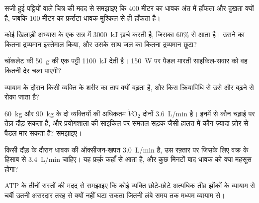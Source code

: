 \begin{exercise}[$\star\star$]\label{exo:g10:exercise-and-energy:8}
सजी हुई पट्टियों वाले चित्र की मदद से समझाइए कि 400 मीटर का धावक अंत में
हाँफता और दुखता क्यों है, जबकि 100 मीटर का फ़र्राटा धावक मुश्किल से ही
हाँफता है।
\end{exercise}

\begin{exercise}[$\star\star$]\label{exo:g10:exercise-and-energy:9}
कोई खिलाड़ी अभ्यास के एक सत्र में \qty{3000}{kJ} ख़र्च करती है, जिसका
60\%  से आता है। उसने  का कितना द्रव्यमान इस्तेमाल
किया, और उसके साथ जल का कितना द्रव्यमान छूटा?
\end{exercise}

\begin{exercise}[$\star\star$]\label{exo:g10:exercise-and-energy:10}
चॉकलेट की \qty{50}{g} की एक पट्टी \qty{1100}{kJ} देती है। \qty{150}{W}
पर पैडल मारती साइकिल-सवार को वह कितनी देर चला पाएगी?
\end{exercise}

\begin{exercise}[$\star\star$]\label{exo:g10:exercise-and-energy:11}
व्यायाम के दौरान किसी व्यक्ति के शरीर का ताप क्यों बढ़ता है, और किस
क्रियाविधि से उसे और बढ़ने से रोका जाता है?
\end{exercise}

\begin{exercise}[$\star\star\star$]\label{exo:g10:exercise-and-energy:12}
\qty{60}{kg} और \qty{90}{kg} के दो व्यक्तियों की अधिकतम
$\dot V\!\mathrm{O_2}$ दोनों \qty{3.6}{L/min} है। इनमें से कौन चढ़ाई पर
तेज़ दौड़ सकता है, और प्रयोगशाला की साइकिल पर समतल सड़क जैसी हालत में
कौन ज़्यादा ज़ोर से पैडल मार सकता है? समझाइए।
\end{exercise}

\begin{exercise}[$\star\star\star$]\label{exo:g10:exercise-and-energy:13}
किसी दौड़ के दौरान धावक की ऑक्सीजन-खपत \qty{3.0}{L/min} है, उस रफ़्तार
पर जिसके लिए वक्र के हिसाब से \qty{3.4}{L/min} चाहिए। यह फ़र्क़ कहाँ से
आता है, और कुछ मिनटों बाद धावक को क्या महसूस होगा?
\end{exercise}

\begin{exercise}[$\star\star\star$]\label{exo:g10:exercise-and-energy:14}
ATP के तीनों रास्तों की मदद से समझाइए कि कोई व्यक्ति छोटे-छोटे अत्यधिक
तीव्र झोंकों के व्यायाम से चर्बी उतनी असरदार तरह से क्यों नहीं घटा सकता
जितनी लंबे समय तक मध्यम व्यायाम से।
\end{exercise}

